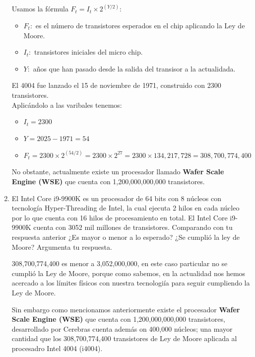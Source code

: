 \documentclass[12pt,letterpaper]{article}
\begin{document}
\begin{enumerate}
  Usamos la f\'{o}rmula $F_t= I_t \times 2^{(Y/2)}:$
  \begin{itemize}
  \item $F_t:$ es el número de transistores esperados en el chip aplicando la Ley de Moore.
  \item $I_t:$ transistores iniciales del micro chip.
  \item $Y:$ años que han pasado desde la salida del transisor a la actualidada.
  \end{itemize}
  
  El 4004 fue lanzado el 15 de noviembre de 1971, construido con 2300 transistores.\\
  Aplic\'{a}ndolo a las varibales tenemos:

  \begin{itemize}
    
  \item $I_t = 2300$
  \item $Y = 2025- 1971 = 54$
  \item $F_t= 2300 \times 2^{(54/2)} = 2300 \times 2^{27} = 2300 \times 134,217,728 = 308,700,774,400$
  \end{itemize}

  No obstante, actualmente existe un procesador llamado \textbf{Wafer Scale Engine (WSE)} que cuenta con 1,200,000,000,000 transistores.
  \bigskip
  
\item El Intel Core i9-9900K es un procesador de 64 bits con 8 núcleos con tecnología Hyper-Threading de Intel, la cual ejecuta 2 hilos en cada núcleo por lo que cuenta con 16 hilos de procesamiento en total. El Intel Core i9-9900K cuenta con 3052 mil millones de transistores. Comparando con tu respuesta anterior ¿Es mayor o menor a lo esperado? ¿Se cumplió la ley de Moore? Argumenta tu respuesta.

  \bigskip
  
  308,700,774,400 es menor a 3,052,000,000, en este caso particular no se cumpli\'{o} la Ley de Moore, porque como sabemos, en la actualidad nos hemos acercado a los l\'{i}mites f\'{i}sicos con nuestra tecnologi\'{i}a para seguir cumpliendo la Ley de Moore.

  Sin embargo como mencionamos anteriormente existe el procesador \textbf{Wafer Scale Engine (WSE)} que cuenta con 1,200,000,000,000 transistores, desarrollado por Cerebras cuenta adem\'{a}s on 400,000 n\'{u}cleos; una mayor cantidad que los 308,700,774,400 transistores de Ley de Moore aplicada al procesadro Intel 4004 (i4004).
  \bigskip
\end{enumerate}
\end{document}
